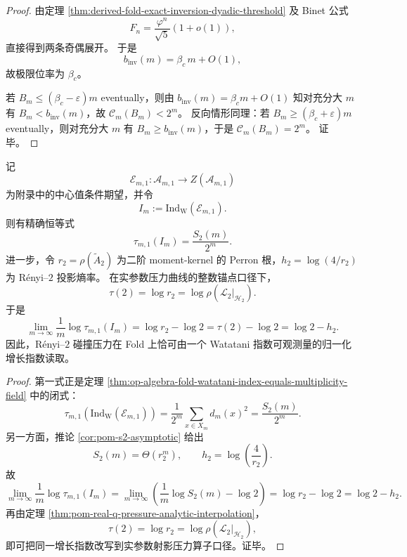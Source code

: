 \begin{proof}
由定理 \ref{thm:derived-fold-exact-inversion-dyadic-threshold} 及 Binet 公式
\[
F_n=\frac{\varphi^n}{\sqrt5}(1+o(1)),
\]
直接得到两条奇偶展开。
于是
\[
b_{\mathrm{inv}}(m)=\beta_c\,m+O(1),
\]
故极限位率为 \(\beta_c\)。

若 \(B_m\le(\beta_c-\varepsilon)m\) eventually，则由
\(
b_{\mathrm{inv}}(m)=\beta_c m+O(1)
\)
知对充分大 \(m\) 有 \(B_m<b_{\mathrm{inv}}(m)\)，故
\(
\mathcal C_m(B_m)<2^m
\)。
反向情形同理：若 \(B_m\ge(\beta_c+\varepsilon)m\) eventually，则对充分大 \(m\) 有 \(B_m\ge b_{\mathrm{inv}}(m)\)，于是
\(
\mathcal C_m(B_m)=2^m
\)。
证毕。
\end{proof}

\begin{theorem}\label{thm:derived-fold-watatani-collision-pressure-identity}
记
\[
\mathcal E_{m,1}:\mathcal A_{m,1}\to Z(\mathcal A_{m,1})
\]
为附录中的中心值条件期望，并令
\[
I_m:=\mathrm{Ind}_{\mathrm W}(\mathcal E_{m,1}).
\]
则有精确恒等式
\[
\tau_{m,1}(I_m)=\frac{S_2(m)}{2^m}.
\]
进一步，令 \(r_2=\rho(\widetilde A_2)\) 为二阶 moment-kernel 的 Perron 根，\(h_2=\log(4/r_2)\) 为 Rényi--\(2\) 投影熵率。
在实参数压力曲线的整数锚点口径下，
\[
\tau(2)=\log r_2=\log \rho(\mathcal L_2|_{\mathcal H_2}).
\]
于是
\[
\lim_{m\to\infty}\frac1m\log \tau_{m,1}(I_m)
=
\log r_2-\log 2
=
\tau(2)-\log 2
=
\log 2-h_2.
\]
因此，Rényi--\(2\) 碰撞压力在 Fold 上恰可由一个 Watatani 指数可观测量的归一化增长指数读取。
\end{theorem}

\begin{proof}
第一式正是定理 \ref{thm:op-algebra-fold-watatani-index-equals-multiplicity-field}
中的闭式：
\[
\tau_{m,1}\!\left(\mathrm{Ind}_{\mathrm W}(\mathcal E_{m,1})\right)
=
\frac{1}{2^m}\sum_{x\in X_m}d_m(x)^2
=
\frac{S_2(m)}{2^m}.
\]
另一方面，推论 \ref{cor:pom-s2-asymptotic} 给出
\[
S_2(m)=\Theta(r_2^m),
\qquad
h_2=\log\!\left(\frac{4}{r_2}\right).
\]
故
\[
\lim_{m\to\infty}\frac1m\log \tau_{m,1}(I_m)
=
\lim_{m\to\infty}\left(\frac1m\log S_2(m)-\log 2\right)
=
\log r_2-\log 2
=
\log 2-h_2.
\]
再由定理 \ref{thm:pom-real-q-pressure-analytic-interpolation}，
\[
\tau(2)=\log r_2=\log \rho(\mathcal L_2|_{\mathcal H_2}),
\]
即可把同一增长指数改写到实参数射影压力算子口径。证毕。
\end{proof}

